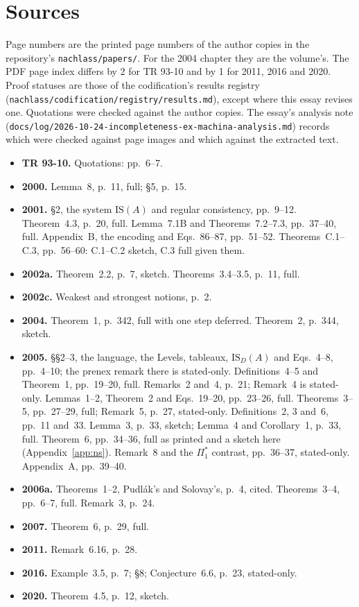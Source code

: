 \documentclass[11pt]{article}
\newcommand{\ISD}{\mathrm{IS}_D(A)}
\theoremstyle{plain}
\theoremstyle{definition}
\begin{document}
\section{Sources}
\label{app:sources}

Page numbers are the printed page numbers of the author copies in the
repository's \nolinkurl{nachlass/papers/}. For the 2004 chapter they are the
volume's. The PDF page index differs by 2 for TR 93-10 and by 1 for 2011,
2016 and 2020. Proof statuses are those of the codification's results
registry (\nolinkurl{nachlass/codification/registry/results.md}), except where
this essay revises one. Quotations were checked against the author copies.
The essay's analysis note
(\nolinkurl{docs/log/2026-10-24-incompleteness-ex-machina-analysis.md}) records
which were checked against page images and which against the extracted text.

\begin{itemize}[leftmargin=1.5em, itemsep=1pt, label={}]\small
\item[] \textbf{TR 93-10.} Quotations: pp.~6--7.
\item[] \textbf{2000.} Lemma~8, p.~11, full; \S5, p.~15.
\item[] \textbf{2001.} \S2, the system $\mathrm{IS}(A)$ and regular
  consistency, pp.~9--12. Theorem~4.3, p.~20, full. Lemma~7.1B and
  Theorems~7.2--7.3, pp.~37--40, full. Appendix~B, the encoding and
  Eqs.~86--87, pp.~51--52. Theorems~C.1--C.3, pp.~56--60: C.1--C.2 sketch,
  C.3 full given them.
\item[] \textbf{2002a.} Theorem~2.2, p.~7, sketch. Theorems~3.4--3.5, p.~11,
  full.
\item[] \textbf{2002c.} Weakest and strongest notions, p.~2.
\item[] \textbf{2004.} Theorem~1, p.~342, full with one step deferred.
  Theorem~2, p.~344, sketch.
\item[] \textbf{2005.} \S\S2--3, the language, the Levels, tableaux, $\ISD$
  and Eqs.~4--8, pp.~4--10; the prenex remark there is stated-only.
  Definitions~4--5 and Theorem~1, pp.~19--20, full. Remarks~2 and~4, p.~21;
  Remark~4 is stated-only. Lemmas~1--2, Theorem~2 and Eqs.~19--20,
  pp.~23--26, full. Theorems~3--5, pp.~27--29, full; Remark~5, p.~27,
  stated-only. Definitions~2, 3 and~6, pp.~11 and~33. Lemma~3, p.~33,
  sketch; Lemma~4 and Corollary~1, p.~33, full. Theorem~6, pp.~34--36, full
  as printed and a sketch here (Appendix~\ref{app:ns}). Remark~8 and the
  $\Pi_1^*$ contrast, pp.~36--37, stated-only. Appendix~A, pp.~39--40.
\item[] \textbf{2006a.} Theorems~1--2, Pudlák's and Solovay's, p.~4, cited.
  Theorems~3--4, pp.~6--7, full. Remark~3, p.~24.
\item[] \textbf{2007.} Theorem~6, p.~29, full.
\item[] \textbf{2011.} Remark~6.16, p.~28.
\item[] \textbf{2016.} Example~3.5, p.~7; \S8; Conjecture~6.6, p.~23,
  stated-only.
\item[] \textbf{2020.} Theorem~4.5, p.~12, sketch.
\end{itemize}
\end{document}
